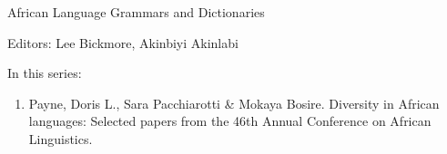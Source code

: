 {\large African Language Grammars and Dictionaries}

\bigskip

Editors:  Lee Bickmore,  Akinbiyi Akinlabi 


\bigskip

In this series:

\begin{enumerate}
\item Payne, Doris L., Sara Pacchiarotti \& Mokaya Bosire. Diversity in African languages: Selected papers from the 46th Annual Conference on African Linguistics.
\end{enumerate}


\vfill

